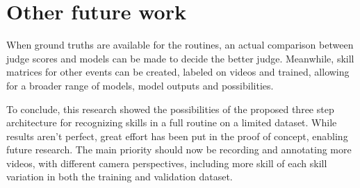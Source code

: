 \section{Other future work}
\label{discussion:future-work}

When ground truths are available for the routines, an actual comparison between judge scores and models can be made to decide the better judge. Meanwhile, skill matrices for other events can be created, labeled on videos and trained, allowing for a broader range of models, model outputs and possibilities.

To conclude, this research showed the possibilities of the proposed three step architecture for recognizing skills in a full routine on a limited dataset. While results aren't perfect, great effort has been put in the proof of concept, enabling future research. The main priority should now be recording and annotating more videos, with different camera perspectives, including more skill of each skill variation in both the training and validation dataset.

